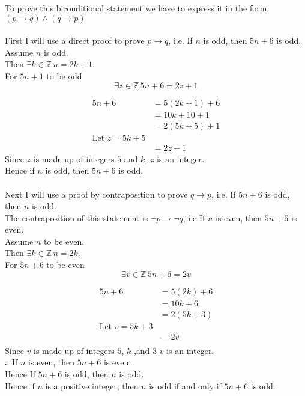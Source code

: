 \documentclass[12pt letter]{report}
\begin{document}
\begin{myproof}
	To prove this biconditional statement we have to express it in the form $\left( p \to q \right) \wedge \left( q \to
		p\right)  $\\
	\\
	First I will use a direct proof to prove $p \to q$, i.e. If $n$ is odd, then $5n + 6$ is odd. \\
	Assume $n$ is odd. \\
	Then $\exists k \in \mathbb{Z} \, n = 2k+ 1$. \\
	For $5n + 1$ to be odd
	\[
		\exists z \in \mathbb{Z} \, 5n + 6 = 2z + 1
	\]

	\begin{align*}
		5n + 6 & = 5 \left( 2k + 1 \right)  + 6 \\
		       & = 10k + 10 + 1                 \\
		       & = 2 \left( 5k + 5 \right)  + 1 \\
		\text{Let } z = 5k + 5                  \\
		       & = 2z + 1
	\end{align*}
	Since $z$ is made up of integers $5$ and $k$, $z$ is an integer.\\
	Hence if $n$ is odd, then  $5n + 6$ is odd.\\
	\\

	\noindent Next I will use a proof by contraposition to prove $q \to p$, i.e. If $5n + 6$ is odd, then $n$ is odd.\\
	The contraposition of this statement is $\neg p \to \neg q $, i.e If $n$ is even, then $5n + 6$ is even.\\
	Assume $n$ to be even.\\
	Then $\exists k \in \mathbb{Z}\, n = 2k$.\\
	For $5n + 6$ to be even
	\[
		\exists v \in \mathbb{Z} \, 5n + 6 = 2v
	\]

	\begin{align*}
		5n + 6 & = 5 \left( 2k \right)  + 6 \\
		       & = 10k + 6                  \\
		       & = 2 \left( 5k + 3 \right)  \\
		\text{Let }v = 5k + 3               \\
		       & = 2v                       \\
	\end{align*}
	Since $v$ is made up of integers $5$, $k$ ,and $3$ $v$ is an integer.\\
	$\therefore$ If $n$ is even, then $5n + 6$ is even.\\
	Hence If $5n + 6$ is odd, then $n$ is odd.
	\\
	Hence if $n$ is a positive integer, then $n$ is odd if and only if $5n + 6$ is odd.


\end{myproof}
\end{document}
